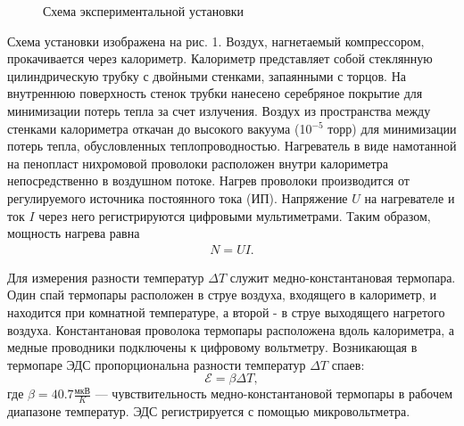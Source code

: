 \documentclass[a4paper, 12pt]{article}%
\begin{document}
\begin{figure}[h]
	\caption{Схема экспериментальной установки}
\end{figure}
Схема установки изображена на рис. 1. Воздух, нагнетаемый компрессором, прокачивается через калориметр. Калориметр представляет собой стеклянную цилиндрическую трубку с двойными стенками, запаянными с торцов. На внутреннюю поверхность стенок трубки нанесено серебряное покрытие для минимизации потерь тепла за счет излучения. Воздух из пространства между стенками калориметра откачан до высокого вакуума (10$^{-5}$ торр) для минимизации потерь тепла, обусловленных теплопроводностью. Нагреватель в виде намотанной на пенопласт нихромовой проволоки расположен внутри калориметра непосредственно в воздушном потоке. Нагрев проволоки производится от регулируемого источника постоянного тока (ИП). Напряжение $U$ на нагревателе и ток $I$ через него регистрируются цифровыми
мультиметрами. Таким образом, мощность нагрева равна
	\begin{align}
		N = UI.
	\end{align}
	
	Для измерения разности температур $\Delta T$ служит медно-константановая термопара. Один спай термопары расположен в струе воздуха, входящего в калориметр, и находится при комнатной температуре, а второй - в струе выходящего нагретого воздуха. Константановая проволока термопары расположена вдоль калориметра, а медные проводники подключены к цифровому вольтметру. Возникающая в термопаре ЭДС пропорциональна разности температур $\Delta T$ спаев:
	\[
	\mathcal{E} = \beta \Delta T,	
	\]
	где $\beta = 40.7 \frac{\text{мкВ}}{K}$ --- чувствительность медно-константановой термопары в рабочем диапазоне температур. ЭДС регистрируется с помощью микровольтметра.
	
\end{document}
